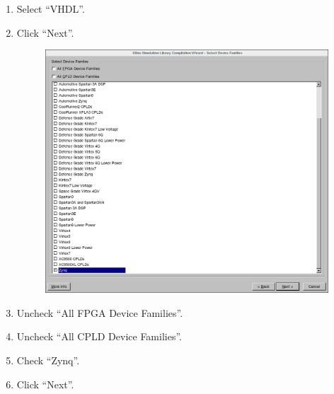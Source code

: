 \begin{flushleft}
\begin{flushleft}
\begin{enumerate}
		\item Select ``VHDL''.
		\item Click ``Next''.

	\begin{figure}[H]
	\centering\captionsetup{type=figure}\includegraphics[scale=0.5]{figures/Xilinx_CompXLib_2_SelectZynq}
		\label{fig:wizard_page_2}
	\end{figure}

		\item Uncheck ``All FPGA Device Families''.
		\item Uncheck ``All CPLD Device Families''.
		\item Check ``Zynq''.
		\item Click ``Next''.


\end{enumerate}
\end{flushleft}
\end{flushleft}
